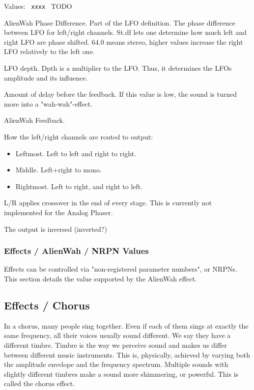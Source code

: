    Values: \texttt{ xxxx } TODO

   AlienWah Phase Difference.
   Part of the LFO definition.
   The phase difference between LFO for left/right channels.
   St.df lets one determine how much left and right LFO are phase shifted.
   64.0 means stereo, higher values increase the right LFO relatively to the
   left one.

   LFO depth.  Dpth is a multiplier to the LFO. Thus, it determines
   the LFOs amplitude and its influence.

   Amount of delay before the feedback.
   If this value is low, the sound is turned more into a "wah-wah"-effect.

   AlienWah Feedback.

   How the left/right channels are routed to output:

   \begin{itemize}
      \item Leftmost. Left to left and right to right.
      \item Middle. Left+right to mono.
      \item Rightmost. Left to right, and right to left.
   \end{itemize}

   L/R applies crossover in the end of every stage. This is currently not
   implemented for the Analog Phaser.

   The output is inversed (inverted?)

\subsubsection{Effects / AlienWah / NRPN Values}
\label{subsubsec:effects_edit_alienwah_nrpn}

Effects can be controlled via "non-registered parameter numbers", or NRPNs.
This section details the value supported by the AlienWah effect.

\subsection{Effects / Chorus}
\label{subsec:effects_edit_chorus}

   In a chorus, many people sing together. Even if each of them sings at
   exactly the same frequency, all their voices usually sound different. We
   say they have a different timbre. Timbre is the way we perceive sound and
   makes us differ between different music instruments. This is, physically,
   achieved by varying both the amplitude envelope and the frequency
   spectrum. Multiple sounds with slightly different timbres make a sound
   more shimmering, or powerful. This is called the chorus effect.

